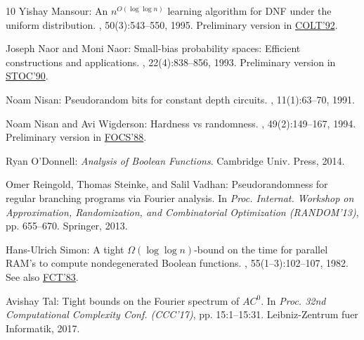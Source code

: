 \documentclass[11pt]{article}
\numberwithin{equation}{section}
\theoremstyle{definition}
\theoremstyle{plain}
\begin{document}
\begin{thebibliography}{10}
{\sc Yishay Mansour}: An $n^{O(\log \log n)}$ learning algorithm for {DNF}
  under the uniform distribution.
, 50(3):543--550, 1995.
\newblock Preliminary version in
  \href{https://dl.acm.org/citation.cfm?doid=130385.130391}{COLT'92}.

{\sc Joseph Naor and Moni Naor}: Small-bias probability spaces: {E}fficient
  constructions and applications.
, 22(4):838--856, 1993.
\newblock Preliminary version in
  \href{https://dl.acm.org/citation.cfm?id=100244}{STOC'90}.
\newblock [\epfmtdoi{10.1137/0222053}]

{\sc Noam Nisan}: Pseudorandom bits for constant depth circuits.
, 11(1):63--70, 1991.
\newblock [\epfmtdoi{10.1007/BF01375474}]

{\sc Noam Nisan and Avi Wigderson}: Hardness vs randomness.
, 49(2):149--167, 1994.
\newblock Preliminary version in
  \href{https://ieeexplore.ieee.org/document/21916}{FOCS'88}.
\newblock [\epfmtdoi{10.1016/S0022-0000(05)80043-1}]

{\sc Ryan O'Donnell}: {\em Analysis of Boolean Functions}.
\newblock Cambridge Univ. Press, 2014.

{\sc Omer Reingold, Thomas Steinke, and Salil Vadhan}: Pseudorandomness for
  regular branching programs via {F}ourier analysis.
\newblock In {\em Proc. Internat. Workshop on Approximation, Randomization, and
  Combinatorial Optimization (RANDOM'13)}, pp. 655--670. Springer, 2013.

{\sc Hans-Ulrich Simon}: A tight {$\Omega(\log\log n)$-bound} on the time for
  parallel {RAM}'s to compute nondegenerated {B}oolean functions.
, 55(1--3):102--107, 1982.
\newblock See also
  \href{https://link.springer.com/chapter/10.1007/3-540-12689-9_124}{FCT'83}.
\newblock [\epfmtdoi{10.1016/S0019-9958(82)90477-6}]

{\sc Avishay Tal}: Tight bounds on the {F}ourier spectrum of ${AC}^0$.
\newblock In {\em Proc. 32nd Computational Complexity Conf. (CCC'17)}, pp.
  15:1--15:31. Leibniz-Zentrum fuer Informatik, 2017.


\end{thebibliography}
\end{document}
